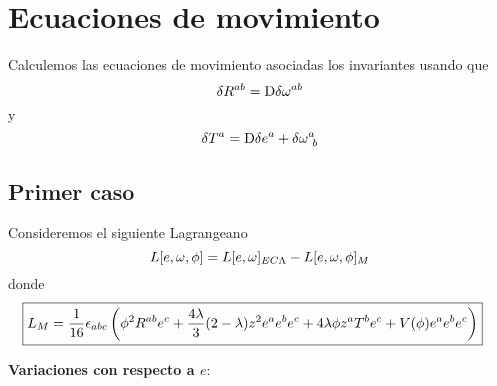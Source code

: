 \section{Ecuaciones de movimiento}
Calculemos las ecuaciones de movimiento asociadas los invariantes usando que
\begin{equation}
  \delta R^{ab}=\mathrm{D} \delta \omega^{ab}
\end{equation}
y
\begin{equation}
  \delta T^{a}=\mathrm{D}\delta e^{a}+\delta \omega^{a}_{~b}
\end{equation}

\subsection{Primer caso}
Consideremos el siguiente Lagrangeano
\begin{equation}
  L[e,\omega,\phi ]=L[e,\omega]_{EC\Lambda}-L[e,\omega,\phi ]_M
\end{equation}
donde 
\begin{align}
 \Aboxed{ L_M&=\frac{1}{16}\eabc \left(\f^2R^{ab}e^c+\frac{4\lambda}{3}(2-\lambda)z^2e^{a}e^be^c+4\lambda\f z^{a}T^be^c+V(\f )e^{a}e^be^c\right)}
\end{align}

\textbf{Variaciones con respecto a $e$}:


